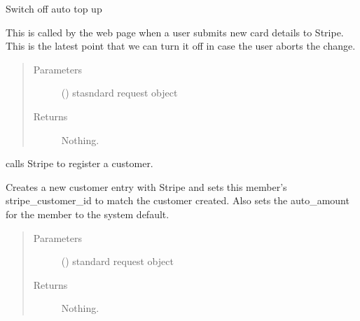 \documentclass[letterpaper,10pt,english]{sphinxmanual}
\begin{document}

\begin{fulllineitems}
\label{\detokenize{payments:payments.views.stripe_autotopup_off}}
Switch off auto top up

This is called by the web page when a user submits new card details to
Stripe. This is the latest point that we can turn it off in case the
user aborts the change.
\begin{quote}\begin{description}
\item[{Parameters}] \leavevmode
{} () \textendash{} stasndard request object

\item[{Returns}] \leavevmode
Nothing.

\end{description}\end{quote}

\end{fulllineitems}


\begin{fulllineitems}
\label{\detokenize{payments:payments.views.stripe_create_customer}}
calls Stripe to register a customer.

Creates a new customer entry with Stripe and sets this member’s
stripe\_customer\_id to match the customer created. Also sets the
auto\_amount for the member to the system default.
\begin{quote}\begin{description}
\item[{Parameters}] \leavevmode
{} () \textendash{} standard request object

\item[{Returns}] \leavevmode
Nothing.

\end{description}\end{quote}

\end{fulllineitems}
\end{document}
